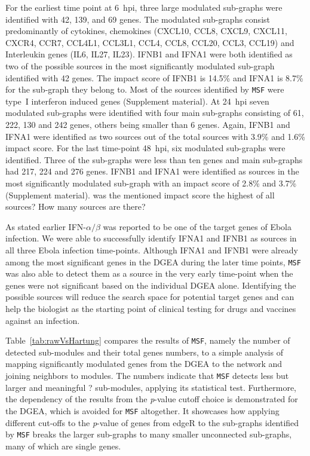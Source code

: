 \documentclass[10pt,a4paper,twocolumn]{article}
\newcommand{\TODO}[1]{\begingroup\color{red}#1\endgroup}
\begin{document}
	For the earliest time point at 6~hpi, three large modulated
        sub-graphs were identified with 42, 139, and 69 genes.  The
        modulated sub-graphs consist predominantly of cytokines,
        chemokines (CXCL10, CCL8, CXCL9, CXCL11, CXCR4, CCR7, CCL4L1,
        CCL3L1, CCL4, CCL8, CCL20, CCL3, CCL19) and Interleukin genes
        (IL6, IL27, IL23).  IFNB1 and IFNA1 were both identified as
        two of the possible sources in the most significantly
        modulated sub-graph identified with 42 genes. The impact score
        of IFNB1 is 14.5\% and IFNA1 is 8.7\% for the sub-graph they
        belong to.  Most of the sources identified by \texttt{MSF}
        were type~I interferon induced genes (Supplement material).
        At 24~hpi seven modulated sub-graphs were identified with four
        main sub-graphs consisting of 61, 222, 130 and 242 genes,
        others being smaller than 6 genes. Again, IFNB1 and IFNA1 were
        identified as two sources out of the total sources with 3.9\%
        and 1.6\% impact score. For the last time-point 48~hpi, six
        modulated sub-graphs were identified. Three of the sub-graphs
        were less than ten genes and main sub-graphs had 217, 224 and
        276 genes. IFNB1 and IFNA1 were identified as sources in the
        most significantly modulated sub-graph with an impact score of
        2.8\% and 3.7\% (Supplement material). \TODO{was the mentioned
          impact score the highest of all sources? How many sources
          are there?}
	
	As stated earlier IFN-$\alpha / \beta$ was reported to be one
        of the target genes of Ebola infection. We were able to
        successfully identify IFNA1 and IFNB1 as sources in all three
        Ebola infection time-points. Although IFNA1 and IFNB1 were
        already among the most significant genes in the DGEA during
        the later time points, \texttt{MSF} was also able to detect
        them as a source in the very early time-point when the genes
        were not significant based on the individual DGEA
        alone. Identifying the possible sources will reduce the search
        space for potential target genes and can help the biologist as
        the starting point of clinical testing for drugs and vaccines
        against an infection.
	
	Table~\ref{tab:rawVsHartung} compares the results of
        \texttt{MSF}, namely the number of detected sub-modules and
        their total genes numbers, to a simple analysis of mapping
        significantly modulated genes from the DGEA to the network and
        joining neighbors to modules. The numbers indicate that
        \texttt{MSF} detects less but larger and meaningful \TODO{?}
        sub-modules, applying its statistical test. Furthermore, the
        dependency of the results from the \textit{p}-value cutoff
        choice is demonstrated for the DGEA, which is avoided for
        \texttt{MSF} altogether. It showcases how applying different
        cut-offs to the \textit{p}-value of genes from edgeR to the
        sub-graphs identified by \texttt{MSF} breaks the larger
        sub-graphs to many smaller unconnected sub-graphs, many of
        which are single genes.
	
\end{document}
